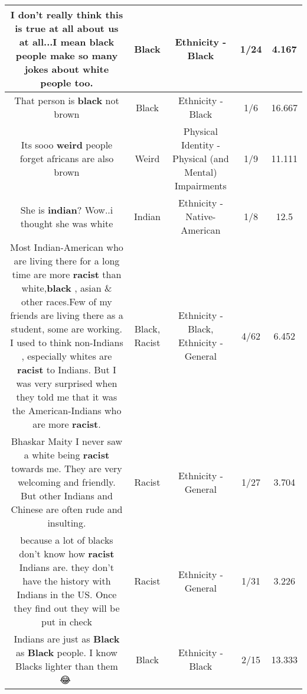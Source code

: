 \documentclass[11pt]{article}
\newlength\mylength
\begin{document}
\begin{center}
\begin{longtable}{|C{.65\mylength}|C{.30\mylength}|C{.12\mylength}|C{.12\mylength}|C{.12\mylength}|}
  \small I don't really think this is true at all about us at all...I mean \textbf{black} people make so many jokes about white people too.\normalsize   & Black & Ethnicity - Black & 1/24 & 4.167 \\  \hline
  \small That person is \textbf{black} not brown\normalsize   & Black & Ethnicity - Black & 1/6 & 16.667 \\  \hline
  \small Its sooo \textbf{weird} people forget africans are also brown\normalsize   & Weird & Physical Identity - Physical (and Mental) Impairments & 1/9 & 11.111 \\  \hline
  \small She is \textbf{indian}? Wow..i thought she was white\normalsize   & Indian & Ethnicity - Native-American & 1/8 & 12.5 \\  \hline
  \small Most Indian-American who are living there for a long time are more \textbf{racist} than white,\textbf{black} , asian \& other races.Few of my friends are living there as a student, some are working. I used to think non-Indians , especially whites are  \textbf{racist} to Indians. But I was very surprised when they told me that it was the American-Indians who are more \textbf{racist}.\normalsize   & Black, Racist & Ethnicity - Black, Ethnicity - General & 4/62 & 6.452 \\  \hline
  \small Bhaskar Maity I never saw a white being \textbf{racist} towards me. They are very welcoming and friendly. But other Indians and Chinese are often rude and insulting.\normalsize   & Racist & Ethnicity - General & 1/27 & 3.704 \\  \hline
  \small because a lot of blacks don't know how \textbf{racist} Indians are.   they don't have the history with Indians in the US.  Once they find out they will be put in check\normalsize   & Racist & Ethnicity - General & 1/31 & 3.226 \\  \hline
  \small Indians are just as \textbf{Black} as \textbf{Black} people. I know Blacks lighter than them 😂💯\normalsize   & Black & Ethnicity - Black & 2/15 & 13.333 \\  \hline

\end{longtable}
\end{center}
\end{document}
